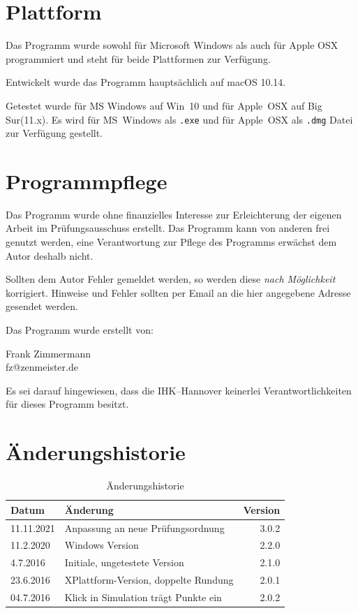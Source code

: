 \documentclass[a4paper,notitlepage,parskip=half]{scrartcl}
\begin{document}
\section{Plattform}
Das Programm wurde sowohl für Microsoft Windows als auch für Apple OSX programmiert und steht für beide Plattformen zur Verfügung. 

Entwickelt wurde das Programm hauptsächlich auf macOS 10.14.

Getestet  wurde für MS Windows auf Win~10 und für Apple~OSX auf Big Sur(11.x).
Es wird für MS~Windows als \texttt{.exe} und für Apple~OSX als \texttt{.dmg} Datei zur Verfügung gestellt. 

\section{Programmpflege}
Das Programm wurde ohne finanzielles Interesse zur Erleichterung der eigenen Arbeit im Prüfungsausschuss erstellt.
Das Programm kann von anderen frei genutzt werden, eine Verantwortung zur Pflege des Programms erwächst dem Autor deshalb nicht.

Sollten dem Autor Fehler gemeldet werden, so werden diese \emph{nach Möglichkeit} korrigiert. Hinweise und Fehler sollten per Email an die hier angegebene Adresse gesendet werden.

Das Programm wurde erstellt von:

Frank Zimmermann\\
fz@zenmeister.de

Es sei darauf hingewiesen, dass die IHK--Hannover keinerlei Verantwortlichkeiten für dieses Programm besitzt.
\section{Änderungshistorie}
\begin{table}[H]\centering
\begin{tabular}{|l|l|r|}
\hline
Datum & Änderung &Version\\
\hline
11.11.2021&	Anpassung an neue Prüfungsordnung	&  3.0.2\\
11.2.2020&	Windows Version						&  2.2.0\\
4.7.2016&	Initiale, ungetestete Version		&  2.1.0\\
23.6.2016&	XPlattform-Version, doppelte Rundung&  2.0.1\\
04.7.2016&	Klick in Simulation trägt Punkte ein&  2.0.2\\
\hline
\end{tabular}
\caption{Änderungshistorie}
\end{table}
\end{document}
